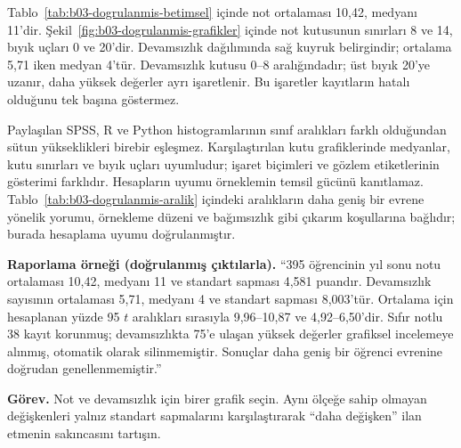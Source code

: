 \begin{outputguidebox}
Tablo~\ref{tab:b03-dogrulanmis-betimsel} içinde not ortalaması 10,42,
medyanı 11'dir. Şekil~\ref{fig:b03-dogrulanmis-grafikler} içinde not
kutusunun sınırları 8 ve 14, bıyık uçları 0 ve 20'dir. Devamsızlık
dağılımında sağ kuyruk belirgindir; ortalama 5,71 iken medyan 4'tür.
Devamsızlık kutusu 0--8 aralığındadır; üst bıyık 20'ye uzanır,
daha yüksek değerler ayrı işaretlenir. Bu işaretler kayıtların hatalı
olduğunu tek başına göstermez.

Paylaşılan SPSS, R ve Python histogramlarının sınıf aralıkları farklı
olduğundan sütun yükseklikleri birebir eşleşmez. Karşılaştırılan kutu
grafiklerinde medyanlar, kutu sınırları ve bıyık uçları uyumludur;
işaret biçimleri ve gözlem etiketlerinin gösterimi farklıdır.
Hesapların uyumu örneklemin temsil gücünü kanıtlamaz.
Tablo~\ref{tab:b03-dogrulanmis-aralik} içindeki aralıkların daha geniş
bir evrene yönelik yorumu, örnekleme düzeni ve bağımsızlık gibi
çıkarım koşullarına bağlıdır; burada hesaplama uyumu doğrulanmıştır.
\end{outputguidebox}

\textbf{Raporlama örneği (doğrulanmış çıktılarla).}
``395 öğrencinin yıl sonu notu ortalaması 10,42, medyanı 11 ve standart
sapması 4,581 puandır. Devamsızlık sayısının ortalaması 5,71, medyanı 4
ve standart sapması 8,003'tür. Ortalama için hesaplanan yüzde 95
$t$ aralıkları sırasıyla 9,96--10,87 ve 4,92--6,50'dir. Sıfır notlu
38 kayıt korunmuş; devamsızlıkta 75'e ulaşan yüksek değerler grafiksel
incelemeye alınmış, otomatik olarak silinmemiştir. Sonuçlar daha geniş
bir öğrenci evrenine doğrudan genellenmemiştir.''


\textbf{Görev.} Not ve devamsızlık için birer grafik seçin. Aynı ölçeğe
sahip olmayan değişkenleri yalnız standart sapmalarını karşılaştırarak
``daha değişken'' ilan etmenin sakıncasını tartışın.